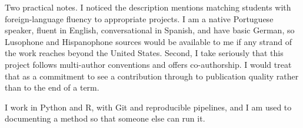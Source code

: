 Two practical notes. I noticed the description mentions matching students with foreign-language fluency to appropriate projects. I am a native Portuguese speaker, fluent in English, conversational in Spanish, and have basic German, so Lusophone and Hispanophone sources would be available to me if any strand of the work reaches beyond the United States. Second, I take seriously that this project follows multi-author conventions and offers co-authorship. I would treat that as a commitment to see a contribution through to publication quality rather than to the end of a term.

I work in Python and R, with Git and reproducible pipelines, and I am used to documenting a method so that someone else can run it.


